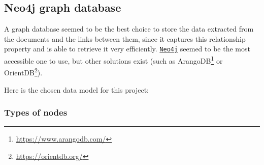 \pagebreak
\subsection{Neo4j graph database} \label{ssec:neo4j-graph-database}

A graph database seemed to be the best choice to store the data extracted from the documents and the links between them, since it captures this relationship property and is able to retrieve it very efficiently. \href{https://neo4j.com/}{\texttt{Neo4j}} seemed to be the most accessible one to use, but other solutions exist (such as ArangoDB\footnote{\url{https://www.arangodb.com/}} or OrientDB\footnote{\url{https://orientdb.org/}}).

Here is the chosen data model for this project:

\subsubsection{Types of nodes} \label{sssec:types-of-nodes}

